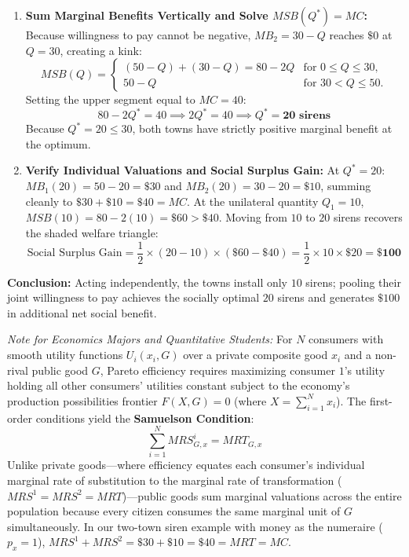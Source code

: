 \documentclass[11pt,letterpaper]{article}
\begin{document}
\begin{tcolorbox}[colback=CourseBlue!5!white,colframe=CourseBlue!80!black,title=\textbf{Work It Out: Vertical Summation for a Local Public Good}]
\begin{enumerate}
    \item \textbf{Sum Marginal Benefits Vertically and Solve $MSB(Q^*) = MC$:}
    Because willingness to pay cannot be negative, $MB_2 = 30 - Q$ reaches $\$0$ at $Q = 30$, creating a kink:
    \[
    MSB(Q) =
    \begin{cases}
    (50 - Q) + (30 - Q) = 80 - 2Q & \text{for } 0 \le Q \le 30, \\
    50 - Q & \text{for } 30 < Q \le 50.
    \end{cases}
    \]
    Setting the upper segment equal to $MC = 40$:
    \[
    80 - 2Q^* = 40 \implies 2Q^* = 40 \implies Q^* = \mathbf{20\text{ sirens}}
    \]
    Because $Q^* = 20 \le 30$, both towns have strictly positive marginal benefit at the optimum.

    \item \textbf{Verify Individual Valuations and Social Surplus Gain:}
    At $Q^* = 20$: $MB_1(20) = 50 - 20 = \$30$ and $MB_2(20) = 30 - 20 = \$10$, summing cleanly to $\$30 + \$10 = \$40 = MC$.
    At the unilateral quantity $Q_1 = 10$, $MSB(10) = 80 - 2(10) = \$60 > \$40$. Moving from $10$ to $20$ sirens recovers the shaded welfare triangle:
    \[
    \text{Social Surplus Gain} = \frac{1}{2} \times (20 - 10) \times (\$60 - \$40) = \frac{1}{2} \times 10 \times \$20 = \mathbf{\$100}
    \]
\end{enumerate}
\textbf{Conclusion:} Acting independently, the towns install only $10$ sirens; pooling their joint willingness to pay achieves the socially optimal $20$ sirens and generates $\$100$ in additional net social benefit.
\end{tcolorbox}

\begin{tcolorbox}[colback=CourseBlue!5!white,colframe=SlateBlue,title=\textbf{Optional Advanced Section: Samuelson Condition for Public Goods}]
\small
\emph{Note for Economics Majors and Quantitative Students:}
For $N$ consumers with smooth utility functions $U_i(x_i, G)$ over a private composite good $x_i$ and a non-rival public good $G$, Pareto efficiency requires maximizing consumer $1$'s utility holding all other consumers' utilities constant subject to the economy's production possibilities frontier $F(X, G) = 0$ (where $X = \sum_{i=1}^N x_i$). The first-order conditions yield the \textbf{Samuelson Condition}:
\[
\sum_{i=1}^{N} MRS_{G, x}^i = MRT_{G, x}
\]
Unlike private goods—where efficiency equates each consumer's individual marginal rate of substitution to the marginal rate of transformation ($MRS^1 = MRS^2 = MRT$)—public goods sum marginal valuations across the entire population because every citizen consumes the same marginal unit of $G$ simultaneously. In our two-town siren example with money as the numeraire ($p_x = 1$), $MRS^1 + MRS^2 = \$30 + \$10 = \$40 = MRT = MC$.
\end{tcolorbox}
\end{document}
